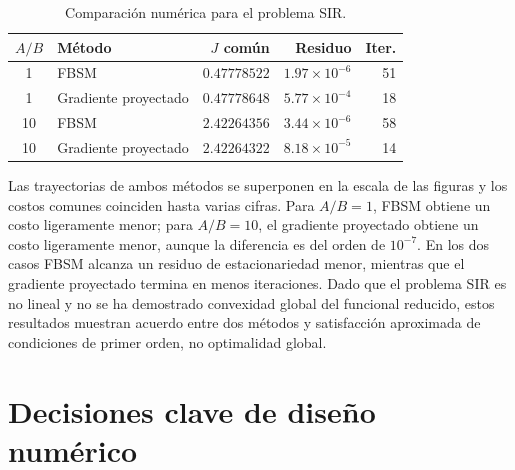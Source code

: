 \documentclass[11pt,a4paper]{article}
\begin{document}
\begin{table}[htbp]
    \centering
    \caption{Comparación numérica para el problema SIR.}
    \label{tab:sir-comparacion}
    \small
    \begin{tabular}{clrrr}
        \toprule
        $A/B$ & Método & $J$ común & Residuo & Iter. \\
        \midrule
        1 & FBSM & $0.47778522$ & $1.97\times10^{-6}$ & 51 \\
        1 & Gradiente proyectado & $0.47778648$ & $5.77\times10^{-4}$ & 18 \\
        10 & FBSM & $2.42264356$ & $3.44\times10^{-6}$ & 58 \\
        10 & Gradiente proyectado & $2.42264322$ & $8.18\times10^{-5}$ & 14 \\
        \bottomrule
    \end{tabular}
\end{table}

Las trayectorias de ambos métodos se superponen en la escala de las figuras y los costos comunes coinciden hasta varias cifras. Para $A/B=1$, FBSM obtiene un costo ligeramente menor; para $A/B=10$, el gradiente proyectado obtiene un costo ligeramente menor, aunque la diferencia es del orden de $10^{-7}$. En los dos casos FBSM alcanza un residuo de estacionariedad menor, mientras que el gradiente proyectado termina en menos iteraciones. Dado que el problema SIR es no lineal y no se ha demostrado convexidad global del funcional reducido, estos resultados muestran acuerdo entre dos métodos y satisfacción aproximada de condiciones de primer orden, no optimalidad global.

\section{Decisiones clave de diseño numérico}
\end{document}
